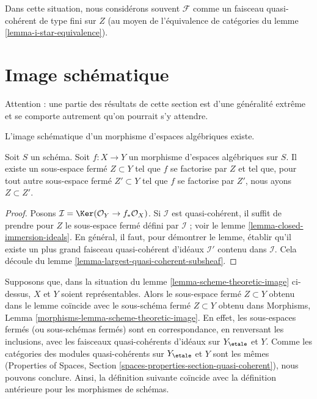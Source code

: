\noindent
Dans cette situation, nous considérons souvent $\mathcal{F}$ comme un faisceau
quasi-cohérent de type fini sur $Z$ (au moyen de l'équivalence de catégories du
lemme \ref{lemma-i-star-equivalence}).






\section{Image schématique}
\label{section-scheme-theoretic-image}

\noindent
Attention : une partie des résultats de cette section est d'une généralité extrême
et se comporte autrement qu'on pourrait s'y attendre.

\begin{lemma}
\label{lemma-scheme-theoretic-image}
\begin{slogan}
L'image schématique d'un morphisme d'espaces algébriques existe.
\end{slogan}
Soit $S$ un schéma. Soit $f : X \to Y$ un morphisme d'espaces algébriques
sur $S$. Il existe un sous-espace fermé $Z \subset Y$ tel que $f$ se factorise
par $Z$ et tel que, pour tout autre sous-espace fermé $Z' \subset Y$ tel que
$f$ se factorise par $Z'$, nous ayons $Z \subset Z'$.
\end{lemma}

\begin{proof}
Posons $\mathcal{I} = \Ker(\mathcal{O}_Y \to f_*\mathcal{O}_X)$.
Si $\mathcal{I}$ est quasi-cohérent, il suffit de prendre pour $Z$ le
sous-espace fermé défini par $\mathcal{I}$ ; voir
le lemme \ref{lemma-closed-immersion-ideals}.
En général, il faut, pour démontrer le lemme, établir qu'il existe
un plus grand faisceau quasi-cohérent d'idéaux $\mathcal{I}'$ contenu dans
$\mathcal{I}$.
Cela découle du lemme \ref{lemma-largest-quasi-coherent-subsheaf}.
\end{proof}

\noindent
Supposons que, dans la situation du lemme \ref{lemma-scheme-theoretic-image}
ci-dessus, $X$ et $Y$ soient représentables. Alors le sous-espace fermé $Z \subset Y$
obtenu dans le lemme coïncide avec le sous-schéma fermé $Z \subset Y$ obtenu dans
Morphisms, Lemma \ref{morphisms-lemma-scheme-theoretic-image}.
En effet, les sous-espaces fermés (ou sous-schémas fermés) sont en correspondance,
en renversant les inclusions, avec les faisceaux quasi-cohérents d'idéaux sur
$Y_\etale$ et $Y$. Comme les catégories des modules quasi-cohérents
sur $Y_\etale$ et $Y$ sont les mêmes
(Properties of Spaces, Section \ref{spaces-properties-section-quasi-coherent}),
nous pouvons conclure. Ainsi, la définition suivante coïncide avec la définition
antérieure pour les morphismes de schémas.

